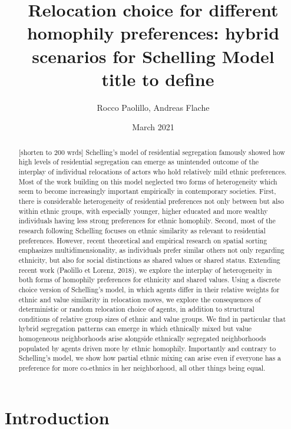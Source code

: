 \documentclass{article}
\title{Relocation choice for different homophily preferences: hybrid scenarios for Schelling Model\\
\ title to define
}
\author{Rocco Paolillo, Andreas Flache}
\date{March 2021}
\begin{document}
\maketitle

\begin{abstract}
[shorten to 200 wrds]   Schelling’s model of residential segregation famously showed how high levels of residential segregation can emerge as unintended outcome of the interplay of individual relocations of actors who hold relatively mild ethnic preferences. Most of the work building on this model neglected two forms of heterogeneity which seem to become increasingly important empirically in contemporary societies. First, there is considerable heterogeneity of residential preferences not only between but also within ethnic groups, with especially younger, higher educated and more wealthy individuals having less strong preferences for ethnic homophily. Second, most of the research following Schelling focuses on ethnic similarity as relevant to residential preferences. However, recent theoretical and empirical research on spatial sorting emphasizes multidimensionality, as individuals prefer similar others not only regarding ethnicity, but also for social distinctions as shared values or shared status. Extending recent work (Paolillo et Lorenz, 2018), we explore the interplay of heterogeneity in both forms of homophily preferences for ethnicity and shared values. Using a discrete choice version of Schelling’s model, in which agents differ in their relative weights for ethnic and value similarity in relocation moves, we explore the consequences of deterministic or random relocation choice of agents, in addition to structural conditions of relative group sizes of ethnic and value groups. We find in particular that hybrid segregation patterns can emerge in which ethnically mixed but value homogeneous neighborhoods arise alongside ethnically segregated neighborhoods populated by agents driven more by ethnic homophily. Importantly and contrary to Schelling’s model, we show how partial ethnic mixing can arise even if everyone has a preference for more co-ethnics in her neighborhood, all other things being equal.
\end{abstract}



\section*{Introduction}
\end{document}
